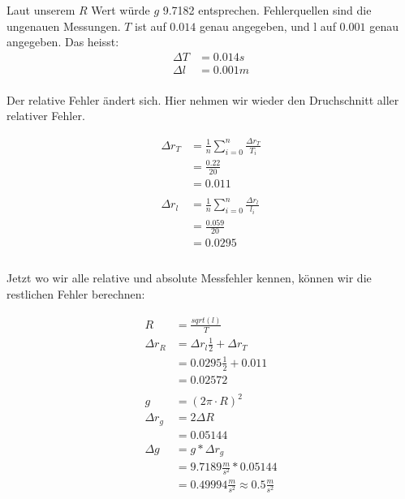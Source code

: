 \documentclass[12pt, a4paper, twoside]{article}
\begin{document}
Laut unserem $R$ Wert würde $g$ 9.7182 entsprechen. Fehlerquellen sind die ungenauen Messungen.
$T$ ist auf $0.014$ genau angegeben, und l auf $0.001$ genau angegeben.
Das heisst:
\begin{align*}
  \Delta T & = 0.014s \\
  \Delta l & = 0.001m \\
\end{align*}

Der relative Fehler ändert sich. Hier nehmen wir wieder den Druchschnitt aller relativer Fehler.

\begin{align*}
  \Delta r_T & = \frac{1}{n}\sum_{i=0}^{n}\frac{\Delta r_T}{T_i} \\
             & = \frac{0.22}{20}                                 \\
             & = 0.011                                           \\
  \\
  \Delta r_l & = \frac{1}{n}\sum_{i=0}^{n}\frac{\Delta r_l}{l_i} \\
             & = \frac{0.059}{20}                                \\
             & = 0.0295                                          \\
  \\
\end{align*}

Jetzt wo wir alle relative und absolute Messfehler kennen, können wir die restlichen Fehler berechnen:

\begin{align*}
  R          & = \frac{sqrt(l)}{T}                           \\
  \Delta r_R & = \Delta r_l\frac{1}{2}+\Delta r_T            \\
             & = 0.0295\frac{1}{2} + 0.011                   \\
             & = 0.02572                                     \\
  \\
  g          & = (2\pi\cdot R)^2                             \\
  \Delta r_g & = 2\Delta R                                   \\
             & = 0.05144                                     \\
  \Delta g   & = g * \Delta r_g                              \\
             & = 9.7189\frac{m}{s^2} * 0.05144               \\
             & = 0.49994\frac{m}{s^2} \approx 0.5\frac{m}{s^2} \\
\end{align*}                     
\end{document}
